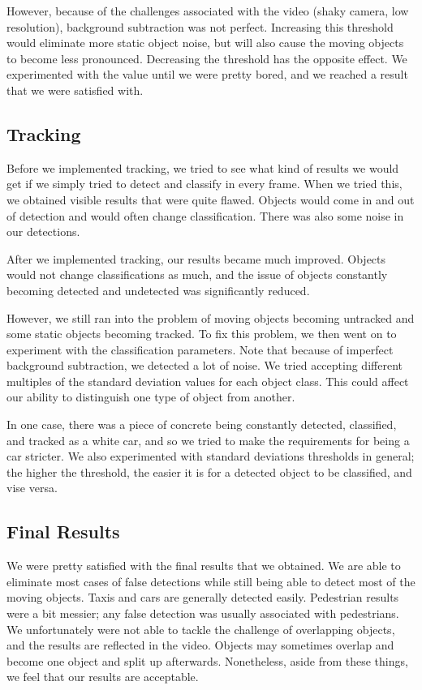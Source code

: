 \documentclass[a4paper, 10pt, conference]{ieeeconf}      %
\begin{document}
However, because of the challenges associated with the video (shaky camera, low resolution), background subtraction was not perfect. Increasing this threshold would eliminate more static object noise, but will also cause the moving objects to become less pronounced. Decreasing the threshold has the opposite effect. We experimented with the value until we were pretty bored, and we reached a result that we were satisfied with. \newline

\subsection{Tracking}
Before we implemented tracking, we tried to see what kind of results we would get if we simply tried to detect and classify in every frame. When we tried this, we obtained visible results that were quite flawed. Objects would come in and out of detection and would often change classification. There was also some noise in our detections. \newline

After we implemented tracking, our results became much improved. Objects would not change classifications as much, and the issue of objects constantly becoming detected and undetected was significantly reduced. \newline

However, we still ran into the problem of moving objects becoming untracked and some static objects becoming tracked. To fix this problem, we then went on to experiment with the classification parameters. Note that because of imperfect background subtraction, we detected a lot of noise. We tried accepting different multiples of the standard deviation values for each object class. This could affect our ability to distinguish one type of object from another. \newline

In one case, there was a piece of concrete being constantly detected, classified, and tracked as a white car, and so we tried to make the requirements for being a car stricter. We also experimented with standard deviations thresholds in general; the higher the threshold, the easier it is for a detected object to be classified, and vise versa. \newline

\subsection{Final Results}
We were pretty satisfied with the final results that we obtained. We are able to eliminate most cases of false detections while still being able to detect most of the moving objects. Taxis and cars are generally detected easily. Pedestrian results were a bit messier; any false detection was usually associated with pedestrians. We unfortunately were not able to tackle the challenge of overlapping objects, and the results are reflected in the video. Objects may sometimes overlap and become one object and split up afterwards. Nonetheless, aside from these things, we feel that our results are acceptable. \newline
\end{document}
